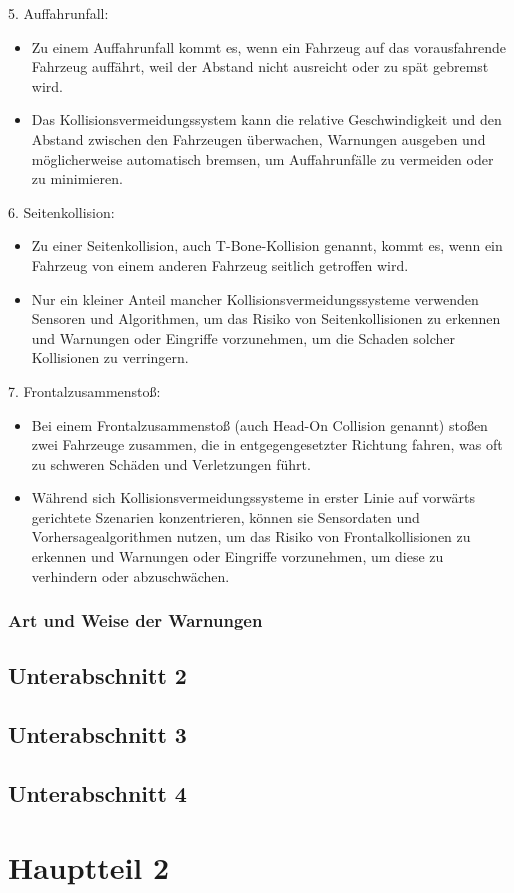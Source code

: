 5. Auffahrunfall:
\begin{itemize}
	\item Zu einem Auffahrunfall kommt es, wenn ein Fahrzeug auf das vorausfahrende Fahrzeug auffährt, weil der Abstand nicht ausreicht oder zu spät gebremst wird.
	\item Das Kollisionsvermeidungssystem kann die relative Geschwindigkeit und den Abstand zwischen den Fahrzeugen überwachen, Warnungen ausgeben und möglicherweise automatisch bremsen, um Auffahrunfälle zu vermeiden oder zu minimieren.
\end{itemize}
6. Seitenkollision:
\begin{itemize}
	\item Zu einer Seitenkollision, auch T-Bone-Kollision genannt, kommt es, wenn ein Fahrzeug von einem anderen Fahrzeug seitlich getroffen wird.
	\item Nur ein kleiner Anteil mancher Kollisionsvermeidungssysteme verwenden Sensoren und Algorithmen, um das Risiko von Seitenkollisionen zu erkennen und Warnungen oder Eingriffe vorzunehmen, um die Schaden solcher Kollisionen zu verringern.
\end{itemize}
7. Frontalzusammenstoß:
\begin{itemize}
	\item Bei einem Frontalzusammenstoß (auch Head-On Collision genannt) stoßen zwei Fahrzeuge zusammen, die in entgegengesetzter Richtung fahren, was oft zu schweren Schäden und Verletzungen führt.
	\item Während sich Kollisionsvermeidungssysteme in erster Linie auf vorwärts gerichtete Szenarien konzentrieren, können sie Sensordaten und Vorhersagealgorithmen nutzen, um das Risiko von Frontalkollisionen zu erkennen und Warnungen oder Eingriffe vorzunehmen, um diese zu verhindern oder abzuschwächen.
\end{itemize}

\subsubsection{Art und Weise der Warnungen}


\subsection{Unterabschnitt 2}

\subsection{Unterabschnitt 3}

\subsection{Unterabschnitt 4}


\section{Hauptteil 2}
